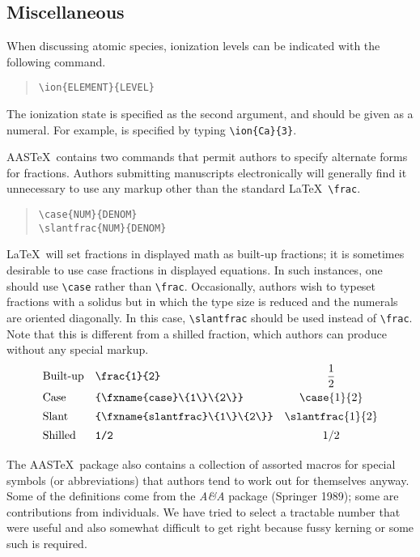 \subsection{Miscellaneous}

When discussing atomic species, ionization levels can be indicated
with the following command.
\begin{quote}
\verb"\ion{ELEMENT}{LEVEL}"
\end{quote}
The ionization state is specified as the second argument,
and should be given as a numeral.
For example,  is specified by typing \verb"\ion{Ca}{3}".

AAS\TeX\ contains two commands that permit authors to specify alternate
forms for fractions.  Authors submitting manuscripts electronically
will generally find it unnecessary to use any markup other than the
standard \LaTeX\ \verb"\frac".
\begin{quote}
\verb"\case{NUM}{DENOM}"\\
\verb"\slantfrac{NUM}{DENOM}"
\end{quote}
\LaTeX\ will set fractions in displayed math as built-up fractions;
it is sometimes desirable to use case fractions in displayed equations.
In such instances, one should use \verb"\case" rather than \verb"\frac".
Occasionally, authors wish to typeset fractions with a solidus but in
which the type size is reduced and the numerals are oriented diagonally.
In this case, \verb"\slantfrac" should be used instead of \verb"\frac".
Note that this is different from a shilled fraction, which authors can
produce without any special markup.
\begin{displaymath}
\renewcommand{\arraystretch}{1.4}
\begin{array}{llc}
\mbox{Built-up} & \verb"\frac{1}{2}" & \displaystyle\frac{1}{2} \\[.5ex]
\mbox{Case} & \verb"\case{1}{2}" & \case{1}{2} \\
\mbox{Slant} & \verb"\slantfrac{1}{2}" & \slantfrac{1}{2} \\
\mbox{Shilled} & \verb"1/2" & 1/2 \\
\end{array}
\end{displaymath}

The AAS\TeX\ package also contains a collection of assorted macros
for special symbols (or abbreviations) that authors tend to work
out for themselves anyway.
Some of the definitions come from the {\it A\&A\/} package (Springer 1989);
some are contributions from individuals.  We have
tried to select a tractable number that were useful and also somewhat
difficult to get right because fussy kerning or some such is required.

